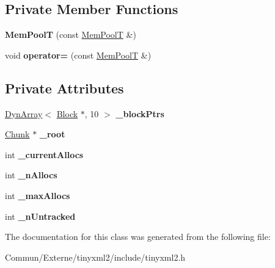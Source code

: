 \subsection*{Private Member Functions}
\begin{DoxyCompactItemize}
\item 
{\bfseries Mem\+PoolT} (const \hyperlink{classtinyxml2_1_1_mem_pool_t}{Mem\+PoolT} \&)\hypertarget{classtinyxml2_1_1_mem_pool_t_af29791e12c82dacd385dde3695119ee2}{}\label{classtinyxml2_1_1_mem_pool_t_af29791e12c82dacd385dde3695119ee2}

\item 
void {\bfseries operator=} (const \hyperlink{classtinyxml2_1_1_mem_pool_t}{Mem\+PoolT} \&)\hypertarget{classtinyxml2_1_1_mem_pool_t_a5e01b67e42601516f2e6c72b3781d8de}{}\label{classtinyxml2_1_1_mem_pool_t_a5e01b67e42601516f2e6c72b3781d8de}

\end{DoxyCompactItemize}
\subsection*{Private Attributes}
\begin{DoxyCompactItemize}
\item 
\hyperlink{classtinyxml2_1_1_dyn_array}{Dyn\+Array}$<$ \hyperlink{structtinyxml2_1_1_mem_pool_t_1_1_block}{Block} $\ast$, 10 $>$ {\bfseries \+\_\+block\+Ptrs}\hypertarget{classtinyxml2_1_1_mem_pool_t_af8eeecccb8c484c34ba04e3757e081be}{}\label{classtinyxml2_1_1_mem_pool_t_af8eeecccb8c484c34ba04e3757e081be}

\item 
\hyperlink{uniontinyxml2_1_1_mem_pool_t_1_1_chunk}{Chunk} $\ast$ {\bfseries \+\_\+root}\hypertarget{classtinyxml2_1_1_mem_pool_t_af203dc16256d7631fcbedd87864390bb}{}\label{classtinyxml2_1_1_mem_pool_t_af203dc16256d7631fcbedd87864390bb}

\item 
int {\bfseries \+\_\+current\+Allocs}\hypertarget{classtinyxml2_1_1_mem_pool_t_ae80f238a4c1fb0b2c037fd62b7bdd0c2}{}\label{classtinyxml2_1_1_mem_pool_t_ae80f238a4c1fb0b2c037fd62b7bdd0c2}

\item 
int {\bfseries \+\_\+n\+Allocs}\hypertarget{classtinyxml2_1_1_mem_pool_t_a1afde0bfad90d20643da123781664d7a}{}\label{classtinyxml2_1_1_mem_pool_t_a1afde0bfad90d20643da123781664d7a}

\item 
int {\bfseries \+\_\+max\+Allocs}\hypertarget{classtinyxml2_1_1_mem_pool_t_ac757df646660b4e8eefaca0d385f97dd}{}\label{classtinyxml2_1_1_mem_pool_t_ac757df646660b4e8eefaca0d385f97dd}

\item 
int {\bfseries \+\_\+n\+Untracked}\hypertarget{classtinyxml2_1_1_mem_pool_t_aca9adac3f7ce44a132dc00c285566b1e}{}\label{classtinyxml2_1_1_mem_pool_t_aca9adac3f7ce44a132dc00c285566b1e}

\end{DoxyCompactItemize}


The documentation for this class was generated from the following file\+:\begin{DoxyCompactItemize}
\item 
Commun/\+Externe/tinyxml2/include/tinyxml2.\+h\end{DoxyCompactItemize}
